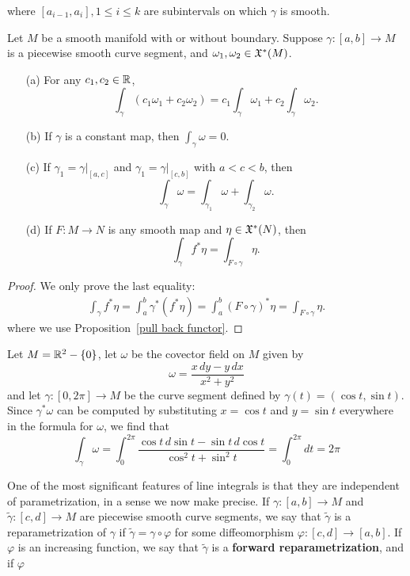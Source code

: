 where $[a_{i-1},a_i],1\leq i\leq k$ are subintervals on which $\gamma$ is smooth.
\begin{proposition}\label{line integral prop}
Let $M$ be a smooth manifold with or without boundary. Suppose $\gamma:[a,b]\to M$ is a piecewise smooth curve segment, and $\omega_1,\omega_2\in\mathfrak{X}^*(M)$.
\begin{itemize}
\item[(a)] For any $c_1,c_2\in\mathbb{R}$,
\[\int_{\gamma}(c_1\omega_1+c_2\omega_2)=c_1\int_{\gamma}\omega_1+c_2\int_{\gamma}\omega_2.\]
\item[(b)] If $\gamma$ is a constant map, then $\int_\gamma\omega=0$.
\item[(c)] If $\gamma_1=\gamma|_{[a,c]}$ and $\gamma_1=\gamma|_{[c,b]}$ with $a<c<b$, then
\[\int_{\gamma}\omega=\int_{\gamma_1}\omega+\int_{\gamma_2}\omega.\]
\item[(d)] If $F:M\to N$ is any smooth map and $\eta\in\mathfrak{X}^*(N)$, then
\[\int_{\gamma}f^*\eta=\int_{F\circ\gamma}\eta.\]
\end{itemize}
\end{proposition}
\begin{proof}
We only prove the last equality:
\begin{align*}
\int_{\gamma}f^*\eta=\int_{a}^{b}\gamma^*(f^*\eta)=\int_{a}^{b}(F\circ\gamma)^*\eta=\int_{F\circ\gamma}\eta.
\end{align*}
where we use Proposition~\ref{pull back functor}.
\end{proof}
\begin{example}\label{covector closed not exact eg}
Let $M=\mathbb{R}^2-\{0\}$, let $\omega$ be the covector field on $M$ given by
\[\omega=\frac{x\,dy-y\,dx}{x^2+y^2}\]
and let $\gamma:[0,2\pi]\to M$ be the curve segment defined by $\gamma(t)=(\cos t,\sin t)$. Since $\gamma^*\omega$ can be computed by substituting $x=\cos t$ and $y=\sin t$ everywhere in the formula for $\omega$, we find that
\[\int_{\gamma}\omega=\int_{0}^{2\pi}\frac{\cos t\,d\sin t-\sin t\,d\cos t}{\cos^2t+\sin^2t}=\int_{0}^{2\pi}dt=2\pi\]
\end{example}
One of the most significant features of line integrals is that they are independent of parametrization, in a sense we now make precise. If $\gamma:[a,b]\to M$ and $\widetilde{\gamma}:[c,d]\to M$ are piecewise smooth curve segments, we say that $\widetilde{\gamma}$ is a reparametrization of $\gamma$ if $\widetilde{\gamma}=\gamma\circ\varphi$ for some diffeomorphism $\varphi:[c,d]\to[a,b]$. If $\varphi$ is an increasing function, we say that $\widetilde{\gamma}$ is a \textbf{forward reparametrization}, and if $\varphi$
